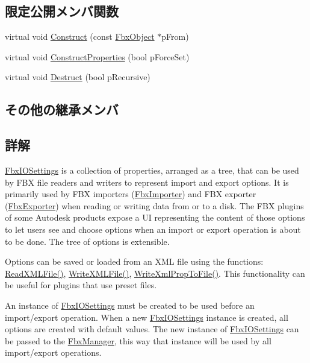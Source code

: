 \subsection*{限定公開メンバ関数}
\begin{DoxyCompactItemize}
\item 
virtual void \hyperlink{class_fbx_i_o_settings_a7f722e05501bf87b108dbd6152bd2451}{Construct} (const \hyperlink{class_fbx_object}{Fbx\+Object} $\ast$p\+From)
\item 
virtual void \hyperlink{class_fbx_i_o_settings_a376a4234985ee351448dfe5b3ee8b128}{Construct\+Properties} (bool p\+Force\+Set)
\item 
virtual void \hyperlink{class_fbx_i_o_settings_ab1680fefd56c9ad5abff5709b905a617}{Destruct} (bool p\+Recursive)
\end{DoxyCompactItemize}
\subsection*{その他の継承メンバ}


\subsection{詳解}
\hyperlink{class_fbx_i_o_settings}{Fbx\+I\+O\+Settings} is a collection of properties, arranged as a tree, that can be used by F\+BX file readers and writers to represent import and export options. It is primarily used by F\+BX importers (\hyperlink{class_fbx_importer}{Fbx\+Importer}) and F\+BX exporter (\hyperlink{class_fbx_exporter}{Fbx\+Exporter}) when reading or writing data from or to a disk. The F\+BX plugins of some Autodesk products expose a UI representing the content of those options to let users see and choose options when an import or export operation is about to be done. The tree of options is extensible.

Options can be saved or loaded from an X\+ML file using the functions\+: \hyperlink{class_fbx_i_o_settings_a83350a45f6370913ca1b2c0527a07d8b}{Read\+X\+M\+L\+File()}, \hyperlink{class_fbx_i_o_settings_a5b8c0000832b00d77e469cfb1b8f4c81}{Write\+X\+M\+L\+File()}, \hyperlink{class_fbx_i_o_settings_abd6cac9a8962bee693960397190a9771}{Write\+Xml\+Prop\+To\+File()}. This functionality can be useful for plugins that use preset files.

An instance of \hyperlink{class_fbx_i_o_settings}{Fbx\+I\+O\+Settings} must be created to be used before an import/export operation. When a new \hyperlink{class_fbx_i_o_settings}{Fbx\+I\+O\+Settings} instance is created, all options are created with default values. The new instance of \hyperlink{class_fbx_i_o_settings}{Fbx\+I\+O\+Settings} can be passed to the \hyperlink{class_fbx_manager}{Fbx\+Manager}, this way that instance will be used by all import/export operations.

